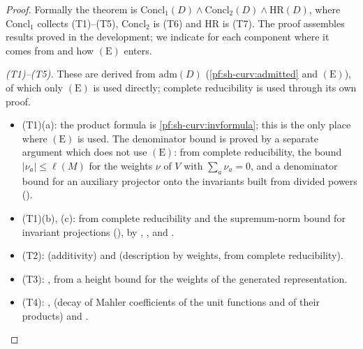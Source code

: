 \begin{proof}
Formally the theorem is $\mathrm{Concl}_1(D)\wedge\mathrm{Concl}_2(D)\wedge\mathrm{HR}(D)$, where $\mathrm{Concl}_1$
collects (T1)--(T5), $\mathrm{Concl}_2$ is (T6) and $\mathrm{HR}$ is (T7). The proof assembles results proved in the
development; we indicate for each component where it comes from and how $(\mathrm E)$ enters.

\emph{(T1)--(T5).} These are derived from $\mathrm{adm}(D)$ (\cref{pf:sh-curv:admitted} and $(\mathrm E)$), of which only
$(\mathrm E)$ is used directly; complete reducibility is used through its own proof.
\begin{itemize}
\item (T1)(a): the product formula is \cref{pf:sh-curv:invformula}; this is the only place where $(\mathrm E)$ is used. The
denominator bound is proved by a separate argument which does not use $(\mathrm E)$: from complete reducibility, the bound
$|\nu_a|\le\ell(M)$ for the weights $\nu$ of $V$ with $\sum_a\nu_a=0$, and a denominator bound for an auxiliary
projector onto the invariants built from divided powers
().
\item (T1)(b), (c): from complete reducibility and the supremum-norm bound for invariant projections
(), by
,
,
 and
.
\item (T2):  (additivity) and
 (description by weights, from
complete reducibility).
\item (T3): , from a height bound
for the weights of the generated representation.
\item (T4): ,
 (decay of Mahler coefficients of the unit
functions and of their products) and .

\end{itemize}
\end{proof}
